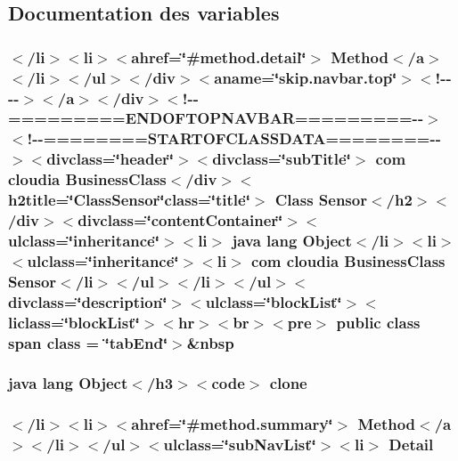 \subsection{Documentation des variables}
\hypertarget{_sensor_8html_a064f643af7e469cdb5aee16192228d44}{
\subsubsection[{class}]{\setlength{\rightskip}{0pt plus 5cm}$<$/li$>$$<$li$>$$<$ahref=\char`\"{}\#method.\-detail\char`\"{}$>$ Method$<$/{\bf a}$>$$<$/li$>$$<$/ul$>$$<$/div$>$$<$aname=\char`\"{}skip.\-navbar.\-top\char`\"{}$>$$<$!-\/-\/-\/-\/$>$$<$/a$>$$<$/div$>$$<$!-\/-\/=========E\-N\-D\-O\-F\-T\-O\-P\-N\-A\-V\-B\-A\-R=========-\/-\/$>$$<$!-\/-\/========S\-T\-A\-R\-T\-O\-F\-C\-L\-A\-S\-S\-D\-A\-T\-A========-\/-\/$>$$<$divclass=\char`\"{}header\char`\"{}$>$$<$divclass=\char`\"{}sub\-Title\char`\"{}$>$ com cloudia Business\-Class$<$/div$>$$<$h2title=\char`\"{}Class\-Sensor\char`\"{}class=\char`\"{}title\char`\"{}$>$ Class {\bf Sensor}$<$/h2$>$$<$/div$>$$<$divclass=\char`\"{}content\-Container\char`\"{}$>$$<$ulclass=\char`\"{}inheritance\char`\"{}$>$$<$li$>$ java lang Object$<$/li$>$$<$li$>$$<$ulclass=\char`\"{}inheritance\char`\"{}$>$$<$li$>$ com cloudia Business\-Class {\bf Sensor}$<$/li$>$$<$/ul$>$$<$/li$>$$<$/ul$>$$<$divclass=\char`\"{}description\char`\"{}$>$$<$ulclass=\char`\"{}block\-List\char`\"{}$>$$<$liclass=\char`\"{}block\-List\char`\"{}$>$$<$hr$>$$<$br$>$$<$pre$>$ public class {\bf span} class = \char`\"{}tab\-End\char`\"{}$>$\&nbsp}}\label{_sensor_8html_a064f643af7e469cdb5aee16192228d44}
\hypertarget{_sensor_8html_adc9607fcabf6f2d7f401ad52015ef6e0}{
\subsubsection[{clone}]{\setlength{\rightskip}{0pt plus 5cm}java lang Object$<$/h3$>$$<$code$>$ clone}}\label{_sensor_8html_adc9607fcabf6f2d7f401ad52015ef6e0}
\hypertarget{_sensor_8html_a1e04b5ec07bcd5281e26dcd40e5b3a94}{
\subsubsection[{Detail}]{\setlength{\rightskip}{0pt plus 5cm}$<$/li$>$$<$li$>$$<$ahref=\char`\"{}\#method.\-summary\char`\"{}$>$ Method$<$/{\bf a}$>$$<$/li$>$$<$/ul$>$$<$ulclass=\char`\"{}sub\-Nav\-List\char`\"{}$>$$<$li$>$ Detail}}\label{_sensor_8html_a1e04b5ec07bcd5281e26dcd40e5b3a94}
